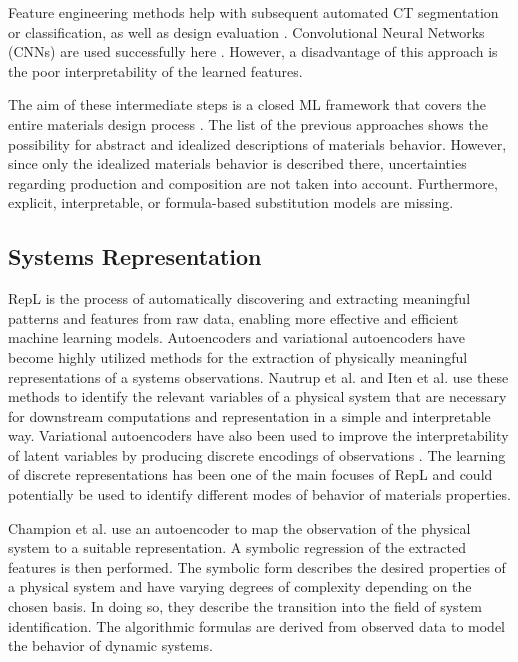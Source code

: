 Feature engineering methods help with subsequent automated CT segmentation or classification, as well as design evaluation \cite{damewood2023representations}. Convolutional Neural Networks (CNNs) are used successfully here \cite{GOBERT2020101460,ziabari2023enabling}. However, a disadvantage of this approach is the poor interpretability of the learned features.

The aim of these intermediate steps is a closed ML framework that covers the entire materials design process \cite{10.3389/fmats.2022.818535,pei2021machine}. The list of the previous approaches shows the possibility for abstract and idealized descriptions of materials behavior. However, since only the idealized materials behavior is described there, uncertainties regarding production and composition are not taken into account. Furthermore, explicit, interpretable, or formula-based substitution models are missing.

\subsection{Systems Representation}
RepL is the process of automatically discovering and extracting meaningful patterns and features from raw data, enabling more effective and efficient machine learning models. Autoencoders and variational autoencoders \cite{kingma:2014a} have become highly utilized methods for the extraction of physically meaningful representations of a systems observations. Nautrup et al. and Iten et al. \cite{PhysRevLett.124.010508, Nautrup} use these methods to identify the relevant variables of a physical system that are necessary for downstream computations and representation in a simple and interpretable way. Variational autoencoders have also been used to improve the interpretability of latent variables by producing discrete encodings of observations \cite{MixReps, SOMVAE, VQVAE}. The learning of discrete representations has been one of the main focuses of RepL and could potentially be used to identify different modes of behavior of materials properties. 

Champion et al. \cite{AutoSR} use an autoencoder to map the observation of the physical system to a suitable representation.  A symbolic regression of the extracted features is then performed. The symbolic form describes the desired properties of a physical system and have varying degrees of complexity depending on the chosen basis. In doing so, they describe the transition into the field of system identification. The algorithmic formulas are derived from observed data to model the behavior of dynamic systems.